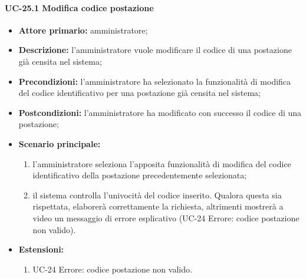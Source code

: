 \paragraph{UC-25.1 Modifica codice postazione}
  \begin{itemize}
	\item \textbf{Attore primario:} amministratore;
	\item \textbf{Descrizione:} l'amministratore vuole modificare il codice di una postazione già censita nel sistema;
	\item \textbf{Precondizioni:} l'amministratore ha selezionato la funzionalità di modifica del codice identificativo per una postazione già censita nel sistema;
	\item \textbf{Postcondizioni:} l'amministratore ha modificato con successo il codice di una postazione;
	\item \textbf{Scenario principale:}
	      \begin{enumerate}
		      \item l'amministratore seleziona l'apposita funzionalità di modifica del codice identificativo della postazione precedentemente selezionata;
		      \item il sistema controlla l'univocità del codice inserito. Qualora questa sia rispettata, elaborerà correttamente la richiesta, altrimenti mostrerà a video un messaggio di errore esplicativo (UC-24 Errore: codice postazione non valido).
	      \end{enumerate}
	\item \textbf{Estensioni:}
		\begin{enumerate}
		      \item UC-24 Errore: codice postazione non valido.
	      \end{enumerate}
\end{itemize}

    

